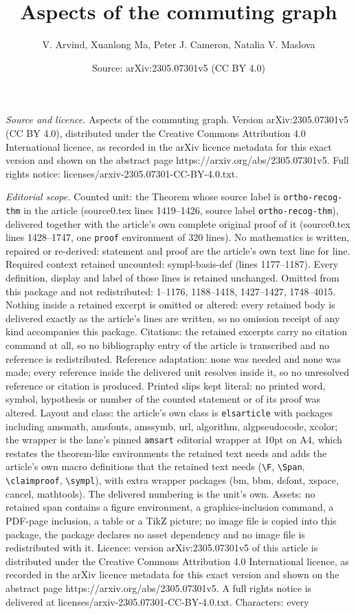\documentclass[10pt,a4paper]{amsart}
\title[Aspects of the commuting graph]{Aspects of the commuting graph}
\author{V. Arvind, Xuanlong Ma, Peter J. Cameron, Natalia V. Maslova}
\date{Source: arXiv:2305.07301v5 (CC BY 4.0)}
\begin{document}
\maketitle

\noindent\emph{Source and licence.} Aspects of the commuting graph. Version arXiv:2305.07301v5 (CC BY 4.0), distributed under the Creative Commons Attribution 4.0 International licence, as recorded in the arXiv licence metadata for this exact version and shown on the abstract page https://arxiv.org/abs/2305.07301v5. Full rights notice: licenses/arxiv-2305.07301-CC-BY-4.0.txt.\par\smallskip

\noindent\textit{Editorial scope.} Counted unit: the Theorem whose source label is \texttt{ortho-recog-thm} in the article (source0.tex lines 1419--1426, source label \texttt{ortho-recog-thm}), delivered together with the article's own complete original proof of it (source0.tex lines 1428--1747, one \texttt{proof} environment of 320 lines). No mathematics is written, repaired or re-derived: statement and proof are the article's own text line for line. Required context retained uncounted: sympl-basis-def (lines 1177--1187). Every definition, display and label of those lines is retained unchanged. Omitted from this package and not redistributed: 1--1176, 1188--1418, 1427--1427, 1748--4015. Nothing inside a retained excerpt is omitted or altered: every retained body is delivered exactly as the article's lines are written, so no omission receipt of any kind accompanies this package. Citations: the retained excerpts carry no citation command at all, so no bibliography entry of the article is transcribed and no reference is redistributed. Reference adaptation: none was needed and none was made; every reference inside the delivered unit resolves inside it, so no unresolved reference or citation is produced. Printed slips kept literal: no printed word, symbol, hypothesis or number of the counted statement or of its proof was altered. Layout and class: the article's own class is \texttt{elsarticle} with packages including amsmath, amsfonts, amssymb, url, algorithm, algpseudocode, xcolor; the wrapper is the lane's pinned \texttt{amsart} editorial wrapper at 10pt on A4, which restates the theorem-like environments the retained text needs and adds the article's own macro definitions that the retained text needs (\texttt{\textbackslash F}, \texttt{\textbackslash Span}, \texttt{\textbackslash claimproof}, \texttt{\textbackslash sympl}), with extra wrapper packages (bm, bbm, dsfont, xspace, cancel, mathtools). The delivered numbering is the unit's own. Assets: no retained span contains a figure environment, a graphics-inclusion command, a PDF-page inclusion, a table or a TikZ picture; no image file is copied into this package, the package declares no asset dependency and no image file is redistributed with it. Licence: version arXiv:2305.07301v5 of this article is distributed under the Creative Commons Attribution 4.0 International licence, as recorded in the arXiv licence metadata for this exact version and shown on the abstract page https://arxiv.org/abs/2305.07301v5. A full rights notice is delivered at licenses/arxiv-2305.07301-CC-BY-4.0.txt. Characters: every 
\end{document}
